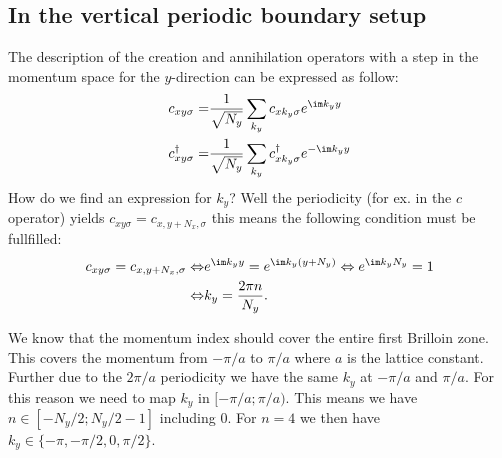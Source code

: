 \documentclass[../main.tex]{subfile}
\begin{document}
\subsection{In the vertical periodic boundary setup}
The description of the creation and annihilation operators with a step in the momentum space for the $y$-direction can be expressed as follow:
\begin{align}
    c_{xy\sigma} =& \frac{1}{\sqrt{N_y}} \sum_{k_y} c_{x k_y\sigma} e^{\im k_y y} \label{eq:C_Foruier}\\
    c^{\dagger}_{xy\sigma} =& \frac{1}{\sqrt{N_y}} \sum_{k_y} c^{\dagger}_{x k_y\sigma} e^{-\im k_y y}\label{eq:C_dagg_Foruier}
\end{align}
How do we find an expression for $k_y$? Well the periodicity (for ex. in the $c$ operator) yields 
$c_{xy\sigma} = c_{x,y+N_x,\sigma}$ this means the following condition must be fullfilled:
\begin{align*}
    c_{xy\sigma} = c_{x,y+N_x,\sigma} \Leftrightarrow &e^{\im k_y y} = e^{\im k_y (y+N_y)} \Leftrightarrow e^{\im k_y N_y} = 1\\
    \Leftrightarrow &k_y = \frac{2\pi n}{N_y}.
\end{align*}

We know that the momentum index should cover the entire first Brilloin zone. This covers the momentum from $-\pi/a$ to $\pi/a$ 
where $a$ is the lattice constant. Further due to the $2\pi/a$ periodicity we have the same $k_y$ at $-\pi/a$ and $\pi/a$.
For this reason we need to map $k_y $ in $[-\pi/a ;\pi/a)$.
This means we have $n\in \left[-N_y/2  ; N_y/2-1\right]$ including $0$. For $n=4$ we then have $k_y\in\{ -\pi, -\pi/2, 0,  \pi/2\}$. \\
\end{document}
